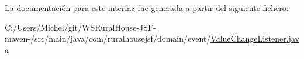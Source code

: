 La documentación para este interfaz fue generada a partir del siguiente fichero\+:\begin{DoxyCompactItemize}
\item 
C\+:/\+Users/\+Michel/git/\+W\+S\+Rural\+House-\/\+J\+S\+F-\/maven-\//src/main/java/com/ruralhousejsf/domain/event/\mbox{\hyperlink{_value_change_listener_8java}{Value\+Change\+Listener.\+java}}\end{DoxyCompactItemize}

